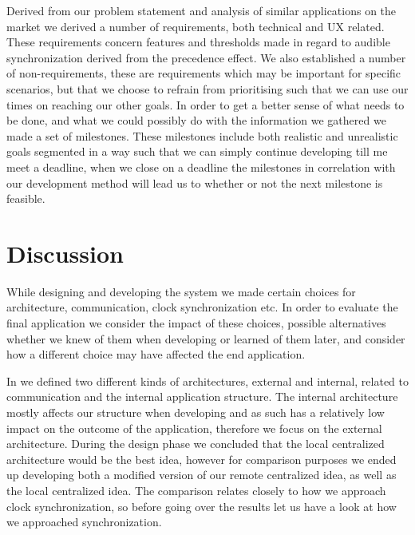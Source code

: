 Derived from our problem statement and analysis of similar applications on the market we derived a number of requirements, both technical and \ac{UX} related.
These requirements concern features and thresholds made in regard to audible synchronization derived from the precedence effect.
We also established a number of non-requirements, these are requirements which may be important for specific scenarios, but that we choose to refrain from prioritising such that we can use our times on reaching our other goals.
In order to get a better sense of what needs to be done, and what we could possibly do with the information we gathered we made a set of milestones.
These milestones include both realistic and unrealistic goals segmented in a way such that we can simply continue developing till me meet a deadline, when we close on a deadline the milestones in correlation with our development method will lead us to whether or not the next milestone is feasible.



\section{Discussion}
While designing and developing the system we made certain choices for architecture, communication, clock synchronization etc.
In order to evaluate the final application we consider the impact of these choices, possible alternatives whether we knew of them when developing or learned of them later, and consider how a different choice may have affected the end application.

In  we defined two different kinds of architectures, external and internal, related to communication and the internal application structure.
The internal architecture mostly affects our structure when developing and as such has a relatively low impact on the outcome of the application, therefore we focus on the external architecture.
During the design phase we concluded that the local centralized architecture would be the best idea, however for comparison purposes we ended up developing both a modified version of our remote centralized idea, as well as the local centralized idea.
The comparison relates closely to how we approach clock synchronization, so before going over the results let us have a look at how we approached synchronization.

